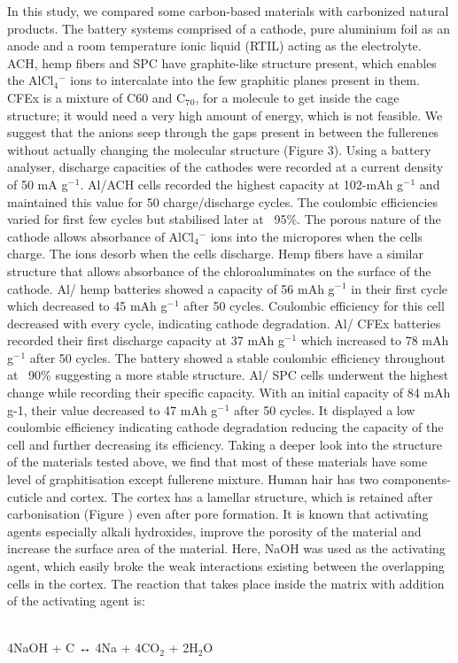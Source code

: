 \documentclass{article}
\begin{document}
In this study, we compared some carbon-based materials with carbonized natural products. The battery systems comprised of a cathode, pure aluminium foil as an anode and a room temperature ionic liquid (RTIL) acting as the electrolyte. ACH, hemp fibers and SPC have graphite-like structure present, which enables the AlCl$_4{^-}$ ions to intercalate into the few graphitic planes present in them. CFEx is a mixture of C60 and C$_7{_0}$, for a molecule to get inside the cage structure; it would need a very high amount of energy, which is not feasible. We suggest that the anions seep through the gaps present in between the fullerenes without actually changing the molecular structure (Figure 3). 
Using a battery analyser, discharge capacities of the cathodes were recorded at a current density of 50 mA g$^-{^1}$. Al/ACH cells recorded the highest capacity at 102-mAh g$^-{^1}$ and maintained this value for 50 charge/discharge cycles. The coulombic efficiencies varied for first few cycles but stabilised later at ~95\%. The porous nature of the cathode allows absorbance of AlCl$_4{^-}$ ions into the micropores when the cells charge. The ions desorb when the cells discharge. Hemp fibers have a similar structure that allows absorbance of the chloroaluminates on the surface of the cathode. Al/ hemp batteries showed a capacity of 56 mAh g$^-{^1}$ in their first cycle which decreased to 45 mAh g$^-{^1}$ after 50 cycles. Coulombic efficiency for this cell decreased with every cycle, indicating cathode degradation. Al/ CFEx batteries recorded their first discharge capacity at 37 mAh g$^-{^1}$ which increased to 78 mAh g$^-{^1}$ after 50 cycles. The battery showed a stable coulombic efficiency throughout at ~90\% suggesting a more stable structure. Al/ SPC cells underwent the highest change while recording their specific capacity. With an initial capacity of 84 mAh g-1, their value decreased to 47 mAh g$^-{^1}$ after 50 cycles.  It displayed a low coulombic efficiency indicating cathode degradation reducing the capacity of the cell and further decreasing its efficiency. 
Taking a deeper look into the structure of the materials tested above, we find that most of these materials have some level of graphitisation except fullerene mixture. Human hair has two components- cuticle and cortex. The cortex has a lamellar structure, which is retained after carbonisation (Figure ) even after pore formation. It is known that activating agents especially alkali hydroxides, improve the porosity of the material and increase the surface area of the material. Here, NaOH was used as the activating agent, which easily broke the weak interactions existing between the overlapping cells in the cortex. The reaction that takes place inside the matrix with addition of the activating agent is:
\begin{center}
    \\4NaOH + C ↔ 4Na + 4CO$_2$ + 2H$_2$O
\end{center}
\end{document}
